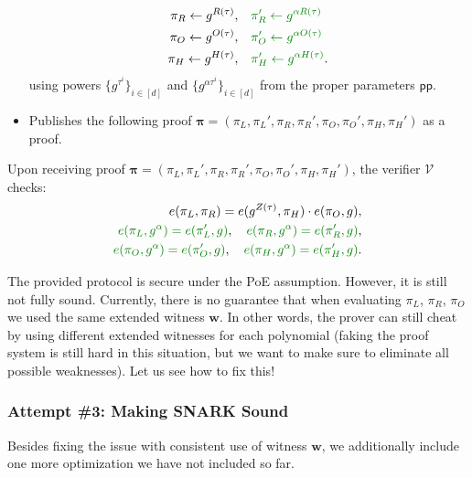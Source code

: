 \documentclass[../lecture-notes.tex]{subfiles}
\begin{document}
\begin{tcolorbox}
\begin{itemize}[label=]
\begin{align*}
            \pi_R \gets g^{R(\tau)}, & \quad\textcolor{green!50!black}{\pi_R' \gets g^{\alpha R(\tau)}} \\
            \pi_O \gets g^{O(\tau)}, & \quad\textcolor{green!50!black}{\pi_O' \gets g^{\alpha O(\tau)}} \\
            \pi_H \gets g^{H(\tau)}, & \quad\textcolor{green!50!black}{\pi_H' \gets g^{\alpha H(\tau)}}.
        \end{align*}
        using powers $\{g^{\tau^i}\}_{i \in [d]}$ and $\{g^{\alpha\tau^i}\}_{i \in [d]}$ from the proper parameters $\mathsf{pp}$.
        \item Publishes the following proof $\boldsymbol{\pi} = (\pi_L,\pi_L',\pi_R,\pi_R',\pi_O,\pi_O',\pi_H,\pi_H')$ as a proof.
    \end{itemize}
    Upon receiving proof $\boldsymbol{\pi} = (\pi_L,\pi_L',\pi_R,\pi_R',\pi_O,\pi_O',\pi_H,\pi_H')$, the verifier $\mathcal{V}$ checks:
    \begin{align*}
        e(\pi_L, \pi_R) = e(g^{Z(\tau)}, \pi_H) \cdot e(\pi_O, g), \\
        \textcolor{green!50!black}{e(\pi_L, g^{\alpha}) = e(\pi_L', g)}, \quad \textcolor{green!50!black}{e(\pi_R, g^{\alpha}) = e(\pi_R', g)}, \\
        \textcolor{green!50!black}{e(\pi_O, g^{\alpha}) = e(\pi_O', g)}, \quad \textcolor{green!50!black}{e(\pi_H, g^{\alpha}) = e(\pi_H', g)}.
    \end{align*}
\end{tcolorbox}

The provided protocol is secure under the PoE assumption. However, it is still not fully sound. Currently, there is no guarantee that when evaluating $\pi_L$, $\pi_R$, $\pi_O$ we used the same extended witness $\mathbf{w}$. In other words, the prover can still cheat by using different extended witnesses for each polynomial (faking the proof system is still hard in this situation, but we want to make sure to eliminate all possible weaknesses). Let us see how to fix this!

\subsubsection{Attempt \#3: Making SNARK Sound}

Besides fixing the issue with consistent use of witness $\mathbf{w}$, we additionally include one more optimization we have not included so far.
\end{document}
